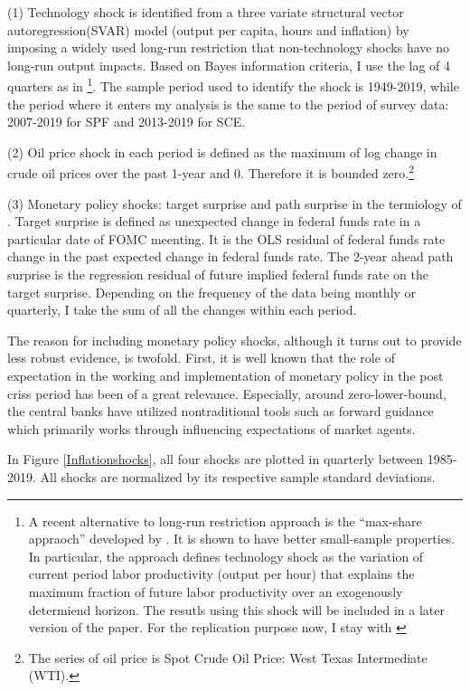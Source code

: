 \documentclass[]{article}
\begin{document}
(1) Technology shock is identified from a three variate structural vector autoregression(SVAR) model  (output per capita, hours and inflation) by imposing a widely used long-run restriction that non-technology shocks have no long-run output impacts. Based on Bayes information criteria, I use the lag of 4 quarters as in \citet{coibion2012can} \footnote{A recent alternative to long-run restriction approach is the ``max-share appraoch'' developed by \citet{francis2014flexible}. It is shown to have better small-sample properties. In particular,  the approach defines technology shock as the variation of current period labor productivity (output per hour) that explains the maximum fraction of future labor productivity over an exogenously determiend horizon. The resutls using this shock will be included in a later version of the paper. For the replication purpose now, I stay with \citet{gali1999technology}}. The sample period used to identify the shock is 1949-2019, while the period where it enters my analysis is the same to the period of survey data: 2007-2019 for SPF and 2013-2019 for SCE. 

(2) Oil price shock in each period is defined as the maximum of log change in crude oil prices over the past 1-year and 0. Therefore it is bounded zero.\footnote{The series of oil price is Spot Crude Oil Price: West Texas Intermediate (WTI).}

(3) Monetary policy shocks: target surprise and path surprise in the termiology of \citet{laseen2011anticipated}. Target surprise is defined as unexpected change in federal funds rate in a particular date of FOMC meenting. It is the OLS residual of federal funds rate change in the past expected change in federal funds rate. The 2-year ahead path surprise is the regression residual of future implied federal funds rate on the target surprise. Depending on the frequency of the data being monthly or quarterly, I take the sum of all the changes within each period.   

The reason for including monetary policy shocks, although it turns out to provide less robust evidence, is twofold. First, it is well known that the role of expectation in the working and implementation of monetary policy in the post criss period has been of a great relevance. Especially, around zero-lower-bound, the central banks have utilized nontraditional tools such as forward guidance which primarily works through influencing expectations of market agents. 

In Figure \ref{Inflationshocks}, all four shocks are plotted in quarterly between 1985-2019. All shocks are normalized by its respective sample standard deviations. 
\end{document}
